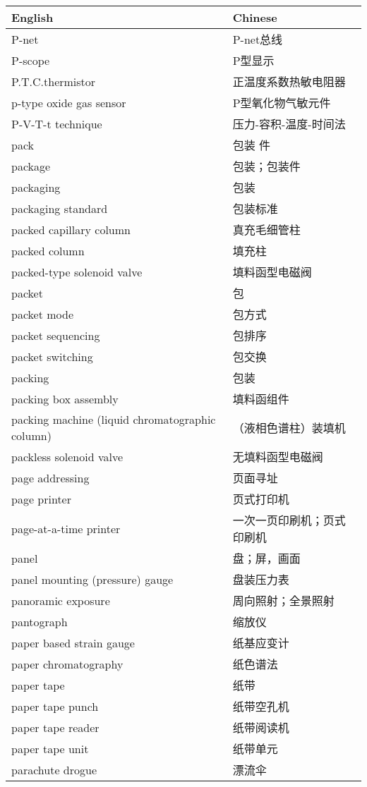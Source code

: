 \documentclass[
]{article}
\begin{document}
\begin{longtable}[]{@{}ll@{}}
\toprule()
English & Chinese \\
\midrule()
\endhead
P-net & P-net总线 \\
P-scope & P型显示 \\
P.T.C.thermistor & 正温度系数热敏电阻器 \\
p-type oxide gas sensor & P型氧化物气敏元件 \\
P-V-T-t technique & 压力-容积-温度-时间法 \\
pack & 包装 件 \\
package & 包装；包装件 \\
packaging & 包装 \\
packaging standard & 包装标准 \\
packed capillary column & 真充毛细管柱 \\
packed column & 填充柱 \\
packed-type solenoid valve & 填料函型电磁阀 \\
packet & 包 \\
packet mode & 包方式 \\
packet sequencing & 包排序 \\
packet switching & 包交换 \\
packing & 包装 \\
packing box assembly & 填料函组件 \\
packing machine (liquid chromatographic column) &
（液相色谱柱）装填机 \\
packless solenoid valve & 无填料函型电磁阀 \\
page addressing & 页面寻址 \\
page printer & 页式打印机 \\
page-at-a-time printer & 一次一页印刷机；页式印刷机 \\
panel & 盘；屏，画面 \\
panel mounting (pressure) gauge & 盘装压力表 \\
panoramic exposure & 周向照射；全景照射 \\
pantograph & 缩放仪 \\
paper based strain gauge & 纸基应变计 \\
paper chromatography & 纸色谱法 \\
paper tape & 纸带 \\
paper tape punch & 纸带空孔机 \\
paper tape reader & 纸带阅读机 \\
paper tape unit & 纸带单元 \\
parachute drogue & 漂流伞 \\

\end{longtable}
\end{document}
